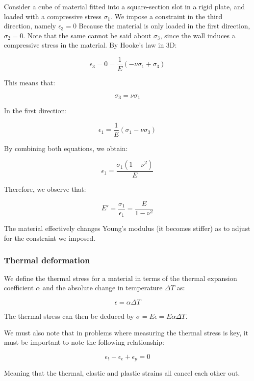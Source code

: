 \documentclass{article}
\begin{document}
\begin{proposition}
    Consider a cube of material fitted into a square-section slot in a rigid plate, and loaded with a compressive stress $\sigma_1$. We impose a constraint in the third direction, namely $\epsilon_3 = 0$ Because the material is only loaded in the first direction, $\sigma_2 = 0$. Note that the same cannot be said about $\sigma_3$, since the wall induces a compressive stress in the material. By Hooke's law in 3D:

    \[ \epsilon_3 = 0 = \frac{1}{E}(-\nu\sigma_1 + \sigma_3) \]

    This means that:

    \[ \sigma_3 = \nu\sigma_1 \]

    In the first direction:

    \[ \epsilon_1 = \frac{1}{E}(\sigma_1 - \nu\sigma_3) \]

    By combining both equations, we obtain:

    \[ \epsilon_1 = \frac{\sigma_1(1 - \nu^2)}{E} \]

    Therefore, we observe that:

    \[ E' = \frac{\sigma_1}{\epsilon_1} = \frac{E}{1 - \nu^2} \]

    The material effectively changes Young's modulus (it becomes stiffer) as to adjust for the constraint we imposed.
\end{proposition}

\subsubsection{Thermal deformation}

\begin{proposition}
    We define the thermal stress for a material in terms of the thermal expansion coefficient $\alpha$ and the absolute change in temperature $\Delta T$ as:

    \[ \epsilon = \alpha\Delta T \]

    The thermal stress can then be deduced by $\sigma = E\epsilon = E\alpha\Delta T$.
\end{proposition}

We must also note that in problems where measuring the thermal stress is key, it must be important to note the following relationship:

\[ \epsilon_t + \epsilon_e + \epsilon_p = 0 \]

Meaning that the thermal, elastic and plastic strains all cancel each other out.
\end{document}
